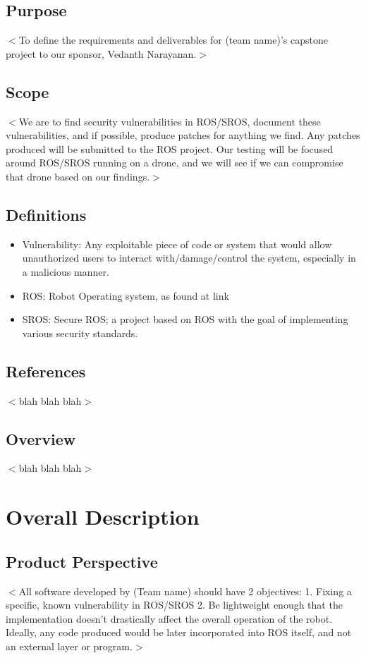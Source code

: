 \documentclass{scrreprt}
\begin{document}
\section{Purpose}
$<$To define the requirements and deliverables for (team name)'s capstone project to our sponsor, Vedanth Narayanan.$>$

\section{Scope}
$<$We are to find security vulnerabilities in ROS/SROS, document these vulnerabilities, and if possible, produce patches for anything we find. Any patches produced will be submitted to the ROS project. Our testing will be focused around ROS/SROS running on a drone, and we will see if we can compromise that drone based on our findings.$>$

\section{Definitions}
\begin{itemize}
  \item Vulnerability: Any exploitable piece of code or system that would allow unauthorized users to interact with/damage/control the system, especially in a malicious manner.
  \item ROS: Robot Operating system, as found at link
  \item SROS: Secure ROS; a project based on ROS with the goal of implementing various security standards.
\end{itemize}

\section{References}
$<$blah blah blah$>$

\section{Overview}
$<$blah blah blah$>$


\chapter{Overall Description}

\section{Product Perspective}
$<$All software developed by (Team name) should have 2 objectives:
1. Fixing a specific, known vulnerability in ROS/SROS
2. Be lightweight enough that the implementation doesn't drastically affect the overall operation of the robot. Ideally, any code produced would be later incorporated into ROS itself, and not an external layer or program.$>$
\end{document}
